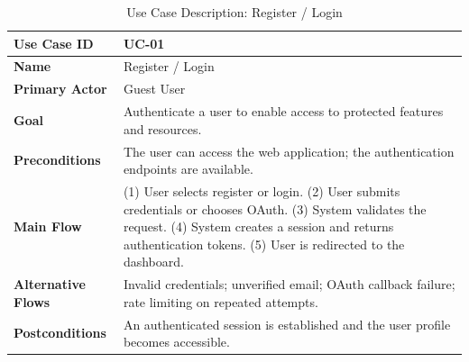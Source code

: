 \begin{table}[H]
    \centering
    \small
    \begin{tabularx}{\textwidth}{|l|X|}
        \hline
        \textbf{Use Case ID}       & UC-01                                                                                                                                                                                                                         \\
        \hline
        \textbf{Name}              & Register / Login                                                                                                                                                                                                              \\
        \hline
        \textbf{Primary Actor}     & Guest User                                                                                                                                                                                                                    \\
        \hline
        \textbf{Goal}              & Authenticate a user to enable access to protected features and resources.                                                                                                                                                     \\
        \hline
        \textbf{Preconditions}     & The user can access the web application; the authentication endpoints are available.                                                                                                                                          \\
        \hline
        \textbf{Main Flow}         & (1) User selects register or login. (2) User submits credentials or chooses OAuth. (3) System validates the request. (4) System creates a session and returns authentication tokens. (5) User is redirected to the dashboard. \\
        \hline
        \textbf{Alternative Flows} & Invalid credentials; unverified email; OAuth callback failure; rate limiting on repeated attempts.                                                                                                                            \\
        \hline
        \textbf{Postconditions}    & An authenticated session is established and the user profile becomes accessible.                                                                                                                                              \\
        \hline
    \end{tabularx}
    \caption{Use Case Description: Register / Login}
    \label{tab:srs-uc-01}
\end{table}

